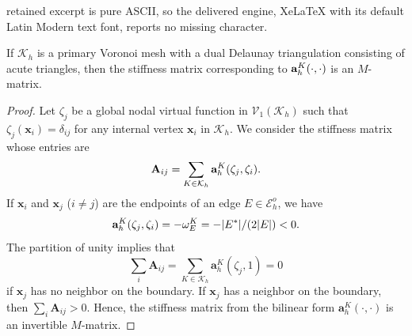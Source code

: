 \documentclass[10pt,a4paper]{amsart}
\newcommand{\Eho}{\mathcal{E}_h^o}
\newcommand{\Kh}{\mathcal{K}_h}
\newcommand{\ba}{{\bf a}}
\begin{document}
retained excerpt is pure ASCII, so the delivered engine, XeLaTeX with its default Latin Modern text font, reports no missing character.
\begin{lemma}\label{lemma: fvm_m_matrix}
If $\Kh$ is a primary Voronoi mesh with a dual Delaunay triangulation consisting of acute triangles, then the stiffness matrix corresponding to $\ba_h^K(\cdot,\cdot)$ is an $M$-matrix.
\end{lemma}

\begin{proof}
Let $\zeta_j$ be a global nodal virtual function in $\mathcal V_1(\Kh)$ such that $\zeta_j(\mathbf{x}_i)=\delta_{ij}$ for any internal vertex $\mathbf{x}_i$ in $\Kh$.
We consider the stiffness matrix whose entries are
\begin{equation*}
\mathbf{A}_{ij}=\sum_{K\in\Kh}\ba_h^{K}(\zeta_j,\zeta_i).
\end{equation*}
If $\mathbf{x}_i$ and $\mathbf{x}_j$ ($i\not=j$) are the endpoints of an edge $E\in \Eho$, we have
\begin{equation*}
\ba_{h}^K(\zeta_j,\zeta_i)=-\omega_E^K=-|E^*|/(2|E|)<0.
\end{equation*}
The partition of unity implies that
\begin{equation*}
\sum_{i}\mathbf{A}_{ij}=\sum_{K\in\mathcal{K}_{h}^{}}\mathbf{a}_h^K(\zeta_j,1)=0
\end{equation*}
if $\mathbf{x}_j$ has no neighbor on the boundary.
If $\mathbf{x}_j$ has a neighbor on the boundary, then $\sum_i \mathbf{A}_{ij}>0$.
Hence, the stiffness matrix from the bilinear form $\mathbf{a}_{h}^K(\cdot,\cdot)$ is an invertible $M$-matrix.
\end{proof}
\end{document}
